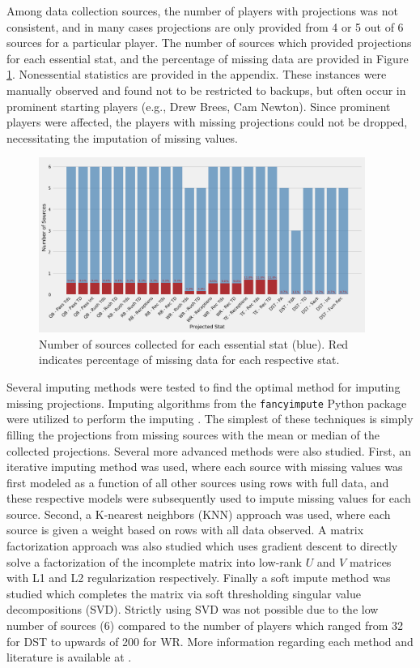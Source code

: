 \documentclass[12pt]{article}
\begin{document}
Among data collection sources, the number of players with projections was not consistent, and in many cases projections are only provided from 4 or 5 out of 6 sources for a particular player. The number of sources which provided projections for each essential stat, and the percentage of missing data are provided in Figure \ref{missing data}. Nonessential statistics are provided in the appendix. These instances were manually observed and found not to be restricted to backups, but often occur in prominent starting players (e.g., Drew Brees, Cam Newton). Since prominent players were affected, the players with missing projections could not be dropped, necessitating the imputation of missing values.\bigskip


\begin{figure}[H]
  \centering
  \includegraphics[width=0.95\textwidth]{../figures/missing_data}
  \caption{Number of sources collected for each essential stat (blue). Red indicates percentage of missing data for each respective stat.}
  \label{missing data}
\end{figure}

Several imputing methods were tested to find the optimal method for imputing missing projections. Imputing algorithms from the \texttt{fancyimpute} Python package were utilized to perform the imputing \cite{fancyimpute}. The simplest of these techniques is simply filling the projections from missing sources with the mean or median of the collected projections. Several more advanced methods were also studied. First, an iterative imputing method was used, where each source with missing values was first modeled as a function of all other sources using rows with full data, and these respective models were subsequently used to impute missing values for each source. Second, a K-nearest neighbors (KNN) approach was used, where each source is given a weight based on rows with all data observed. A matrix factorization approach was also studied which uses gradient descent to directly solve a factorization of the incomplete matrix into low-rank $U$ and $V$ matrices with L1 and L2 regularization respectively. Finally a soft impute method was studied which completes the matrix via soft thresholding singular value decompositions (SVD). Strictly using SVD was not possible due to the low number of sources (6) compared to the number of players which ranged from 32 for DST to upwards of 200 for WR. More information regarding each method and literature is available at \cite{fancyimpute}.\bigskip
\end{document}
